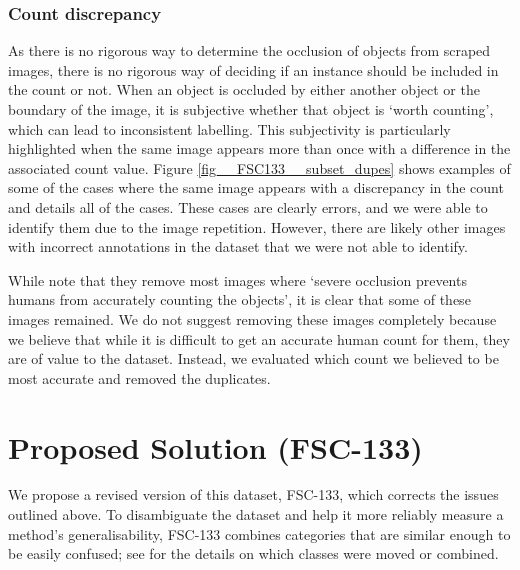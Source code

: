 \documentclass[../thesis.tex]{subfiles}
\begin{document}
\subsubsection{Count discrepancy}\label{sec__FSC133__errors__countdiscrepancy}
As there is no rigorous way to determine the occlusion of objects from scraped images,  there is no rigorous way of deciding if an instance should be included in the count or not.
When an object is occluded by either another object or the boundary of the image, it is subjective whether that object is `worth counting', which can lead to inconsistent labelling.
This subjectivity is particularly highlighted when the same image appears more than once with a difference in the associated count value.
Figure \ref{fig__FSC133__subset_dupes} shows examples of some of the cases where the same image appears with a discrepancy in the count and  details all of the cases. 
These cases are clearly errors, and we were able to identify them due to the image repetition. However, there are likely other images with incorrect annotations in the dataset that we were not able to identify.

While \citet{ranjan2021Famnet} note that they remove most images where `severe occlusion prevents humans from accurately counting the objects', it is clear that some of these images remained. We do not suggest removing these images completely because we believe that while it is difficult to get an accurate human count for them, they are of value to the dataset. Instead, we evaluated which count we believed to be most accurate and removed the duplicates.



\section{Proposed Solution (FSC-133)}\label{sec__fsc133}
We propose a revised version of this dataset, FSC-133, which corrects the issues outlined above.
To disambiguate the dataset and help it more reliably measure a method's generalisability, FSC-133 combines categories that are similar enough to be easily confused; see  for the details on which classes were moved or combined.


\begin{table}
    \centering
    \resizebox{\textwidth}{!}{%
    
    }
    \caption{The breakdown of classes in FSC-147. 
    Note there are identical categories, \eg `red beans' and `kidney beans' are semantically the same as are `baguette rolls', `buns', and `bread rolls'. There are also hierarchical categories, \eg `cranes', `geese', `pigeons', `seagulls', `crows', `swans', and `flamingos' could be classified as also `birds'. 
    We show the classes that are combined in FSC-133 in \textbf{bold} and show the classes that are moved to the training set in FSC-133 in \textcolor{blue}{blue}.}
    \label{table__FSC133__classes_old_table}
\end{table}
\end{document}
